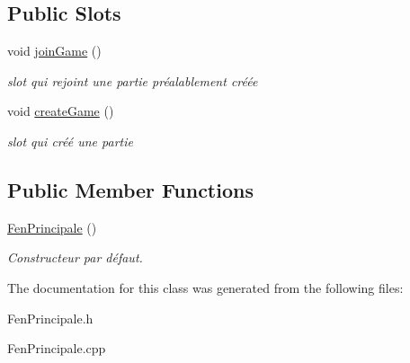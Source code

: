 \subsection*{Public Slots}
\begin{DoxyCompactItemize}
\item 
\mbox{\label{class_fen_principale_a79ad3e983a9fc7e507b88a3894c10503}} 
void \hyperlink{class_fen_principale_a79ad3e983a9fc7e507b88a3894c10503}{join\+Game} ()
\begin{DoxyCompactList}\small\item\em slot qui rejoint une partie préalablement créée \end{DoxyCompactList}\item 
\mbox{\label{class_fen_principale_a2fdc843a29f9d30f3f78cc546d801d87}} 
void \hyperlink{class_fen_principale_a2fdc843a29f9d30f3f78cc546d801d87}{create\+Game} ()
\begin{DoxyCompactList}\small\item\em slot qui créé une partie \end{DoxyCompactList}\end{DoxyCompactItemize}
\subsection*{Public Member Functions}
\begin{DoxyCompactItemize}
\item 
\mbox{\label{class_fen_principale_a529a35ea032da250ad37f7355d1388be}} 
\hyperlink{class_fen_principale_a529a35ea032da250ad37f7355d1388be}{Fen\+Principale} ()
\begin{DoxyCompactList}\small\item\em Constructeur par défaut. \end{DoxyCompactList}\end{DoxyCompactItemize}


The documentation for this class was generated from the following files\+:\begin{DoxyCompactItemize}
\item 
Fen\+Principale.\+h\item 
Fen\+Principale.\+cpp\end{DoxyCompactItemize}
